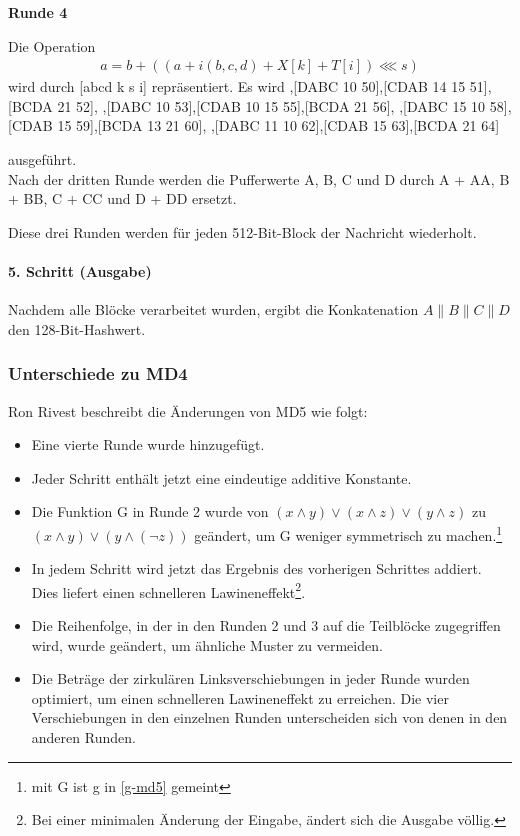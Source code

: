 \documentclass[12pt,a4paper]{scrartcl}
\newcommand{\spar}{\par\vspace{10pt}\noindent}
\numberwithin{equation}{section}
\numberwithin{myalgctr}{section}
\numberwithin{mytheoremctr}{section}
\newcommand{\mpar}[1]{\paragraph*{#1}\mbox{}\par}
\begin{document}
	\noindent \textbf{Runde 4}\par\noindent
	Die Operation 
	\begin{align*}
	a = b+ ((a + i(b,c,d) + X[k] + T[i])\lll s)
	\end{align*}
	wird durch [abcd k s i] repräsentiert. Es wird
	\vspace{.5cm}
	\newline
	[ABCD \:\:0 6 49],\hfill [DABC \: 10 50],\hfill [CDAB 14 15 51],\hfill [BCDA \: 21 52],
	\newline
	[ABCD 12 6 53],\hfill [DABC \: 10 53],\hfill [CDAB 10 15 55],\hfill [BCDA \: 21 56],
	\newline
	[ABCD \:\:8  6 57],\hfill [DABC 15 10 58],\hfill [CDAB \: 15 59],\hfill [BCDA 13 21 60],
	\newline
	[ABCD \:\:4 6 61],\hfill [DABC 11 10 62],\hfill [CDAB \: 15 63],\hfill [BCDA \: 21 64]\:
	\spar
	ausgeführt.\autocite[vgl.][5]{rivest}\\
	\vspace{.5cm}
	\noindent
	Nach der dritten Runde werden die Pufferwerte A, B, C und D durch A + AA, B + BB, C + CC und D + DD ersetzt.\par\noindent
	Diese drei Runden werden für jeden 512-Bit-Block der Nachricht wiederholt.
	
	\mpar{5. Schritt (Ausgabe)}\noindent
	Nachdem alle Blöcke verarbeitet wurden, ergibt die Konkatenation $A\parallel B\parallel C\parallel D$ den 128-Bit-Hashwert.
	
	\subsubsection{Unterschiede zu MD4}
	Ron Rivest beschreibt die Änderungen von MD5 wie folgt\autocite[S. 502~f.]{angewandteKryptographie}:
	\begin{itemize}
		\item[1.] Eine vierte Runde wurde hinzugefügt.
		\item[2.] Jeder Schritt enthält jetzt eine eindeutige additive Konstante.
		\item[3.] Die Funktion G in Runde 2 wurde von $(x\wedge y) \vee (x\wedge z)\vee (y\wedge z)$ zu $(x\wedge y)\vee (y\wedge (\neg z))$ geändert, um G weniger symmetrisch zu machen.\footnote{mit G ist g in \eqref{g-md5} gemeint}
		\item[4.] In jedem Schritt wird jetzt das Ergebnis des vorherigen Schrittes addiert. Dies liefert einen schnelleren Lawineneffekt\footnote{Bei einer minimalen Änderung der Eingabe, ändert sich die Ausgabe völlig.}.
		\item[5.] Die Reihenfolge, in der in den Runden 2 und 3 auf die Teilblöcke zugegriffen wird, wurde geändert, um ähnliche Muster zu vermeiden.
		\item[6.] Die Beträge der zirkulären Linksverschiebungen in jeder Runde wurden optimiert, um einen schnelleren Lawineneffekt zu erreichen. Die vier Verschiebungen in den einzelnen Runden unterscheiden sich von denen in den anderen Runden.
	\end{itemize}
\newpage
\end{document}
